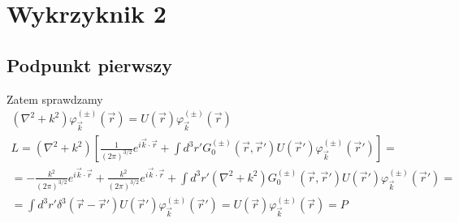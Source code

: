 \documentclass[a4paper,12pt]{article}
\begin{document}
    \section{Wykrzyknik 2}
    	\subsection{Podpunkt pierwszy}
    	Zatem sprawdzamy
    	$$
    	\begin{gathered}
   			 (\nabla^2 +k^2) \varphi_{\vec{k}}^{(\pm)}(\vec{r}) = U(\vec{r})\varphi_{\vec{k}}^{(\pm)}(\vec{r})\\
   			 L = (\nabla^2 +k^2)\left[\frac{1}{(2\pi)^{3/2}}e^{i\vec{k}\cdot\vec{r}}+\int d^3r' G_0^{(\pm)}(\vec{r},\vec{r}')U(\vec{r}')\varphi_{\vec{k}}^{(\pm)}(\vec{r}')\right] = \\
   			= -\frac{k^2}{(2\pi)^{3/2}}e^{i\vec{k}\cdot\vec{r}} +\frac{k^2}{(2\pi)^{3/2}}e^{i\vec{k}\cdot\vec{r}} + \int d^3r'(\nabla^2 +k^2)
   			 G_0^{(\pm)}(\vec{r},\vec{r}')U(\vec{r}')\varphi_{\vec{k}}^{(\pm)}(\vec{r}') = \\
   			 =\int d^3r'\delta^3(\vec{r}-\vec{r}')U(\vec{r}')\varphi_{\vec{k}}^{(\pm)}(\vec{r}') = U(\vec{r})\varphi_{\vec{k}}^{(\pm)}(\vec{r}) = P
    	\end{gathered}
    	$$
\end{document}
